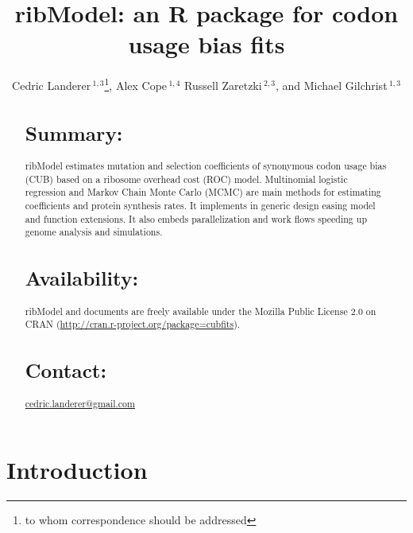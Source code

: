 \documentclass{bioinfo}
\newcommand{\pkg}[1]{{\fontseries{b}\selectfont #1}}
\let\proglang=\textsf
\begin{document}

\title[ribModel]{ribModel: an \proglang{R} package for codon usage bias fits}
\author[
Landerer \textit{et~al}]{Cedric Landerer\,$^{1,3}$\footnote{
to whom correspondence should be addressed
},
Alex Cope\,$^{1,4}$
Russell Zaretzki\,$^{2,3}$, and
Michael Gilchrist\,$^{1,3}$
}
\address{$^{1}$
Department of Ecology and Evolutionary Biology,
$^{2}$Department of Statistics, Operations, and Management Science, and
$^{3}$National Institute for Mathematical and Biological Synthesis,
University of Tennessee, Knoxville, TN, USA,
$^{4}$Oak Ridge National Labratory, Oak Ridge, TN, USA} 


\maketitle

\begin{abstract}

\section{Summary:}
\pkg{ribModel} estimates mutation and selection coefficients of synonymous
codon usage bias (CUB) based on a ribosome overhead cost (ROC) model.
Multinomial logistic regression and Markov Chain Monte Carlo (MCMC) are main
methods for estimating coefficients and protein synthesis rates.
It implements in generic design easing model and function
extensions. It also embeds parallelization and work flows
speeding up genome analysis and simulations.

\section{Availability:}
\pkg{ribModel} and documents are freely available under the Mozilla Public License 2.0
on CRAN (\url{http://cran.r-project.org/package=cubfits}).

\section{Contact:} \href{cedric.landerer@gmail.com}{cedric.landerer@gmail.com}
\end{abstract}


\section*{Introduction}
\end{document}
